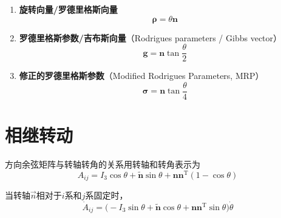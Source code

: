 \begin{enumerate}
\item \textbf{旋转向量/罗德里格斯向量}
\begin{equation}
\boldsymbol{\rho} = \theta\boldsymbol{n}
\end{equation}

\item \textbf{罗德里格斯参数/吉布斯向量}（Rodrigues parameters / Gibbs vector）
\begin{equation}
\boldsymbol{g} = \boldsymbol{n}\tan\frac{\theta}{2}
\end{equation}

\item \textbf{修正的罗德里格斯参数}（Modified Rodrigues Parameters, MRP）
\begin{equation}
\boldsymbol{\sigma} = \boldsymbol{n}\tan\frac{\theta}{4}
\end{equation}
\end{enumerate}

\section{相继转动}

方向余弦矩阵与转轴转角的关系用转轴和转角表示为
\begin{equation}
A_{ij} = I_3\cos\theta + \tilde{\boldsymbol{n}}\sin\theta + \boldsymbol{n}\boldsymbol{n}^{\mathrm{T}}(1 - \cos\theta)
\end{equation}

当转轴$\vec{n}$相对于$i$系和$j$系固定时，
\begin{equation}
\dot{A}_{ij} = \bigl(-I_3\sin\theta + \tilde{\boldsymbol{n}}\cos\theta + \boldsymbol{n}\boldsymbol{n}^{\mathrm{T}}\sin\theta\bigr)\dot{\theta}
\end{equation}

